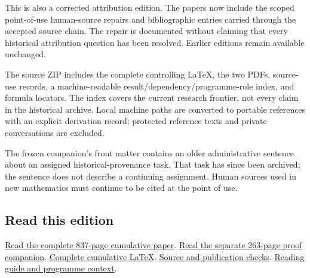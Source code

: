 \documentclass[
]{article}
\begin{document}
This is also a corrected attribution edition. The papers now include the
scoped point-of-use human-source repairs and bibliographic entries
carried through the accepted source chain. The repair is documented
without claiming that every historical attribution question has been
resolved. Earlier editions remain available unchanged.

The source ZIP includes the complete controlling LaTeX, the two PDFs,
source-use records, a machine-readable result/dependency/programme-role
index, and formula locators. The index covers the current research
frontier, not every claim in the historical archive. Local machine paths
are converted to portable references with an explicit derivation record;
protected reference texts and private conversations are excluded.

The frozen companion's front matter contains an older administrative
sentence about an assigned historical-provenance task. That task has
since been archived; the sentence does not describe a continuing
assignment. Human sources used in new mathematics must continue to be
cited at the point of use.

\subsection{Read this edition}\label{read-this-edition}

\href{https://github.com/KokunoYumeto/zeta-function-research-reader/blob/main/workbenches/splitzero-tandem/continuations/20260917-cited-full-tail-return/FULL_RECEIVER_CUMULATIVE_PROOFS.pdf}{Read
the complete 837-page cumulative paper}.
\href{https://github.com/KokunoYumeto/zeta-function-research-reader/blob/main/workbenches/splitzero-tandem/continuations/20260917-cited-full-tail-return/FULL_RECEIVER_PROOF_SUPPLEMENT.pdf}{Read
the separate 263-page proof companion}.
\href{https://github.com/KokunoYumeto/zeta-function-research-reader/blob/main/workbenches/splitzero-tandem/continuations/20260917-cited-full-tail-return/14_CURRENT_KERNEL_AND_MULTIPLICITY_PROOFS.tex}{Complete
cumulative LaTeX}.
\href{https://github.com/KokunoYumeto/zeta-function-research-reader/blob/main/workbenches/splitzero-tandem/continuations/20260917-cited-full-tail-return/PRIVACY_AND_CITATION_PRESERVATION.json}{Source
and publication checks}.
\href{https://github.com/KokunoYumeto/zeta-function-research-reader/blob/main/workbenches/splitzero-tandem/continuations/20260917-cited-full-tail-return/START_HERE.md}{Reading
guide and programme context}.
\end{document}
